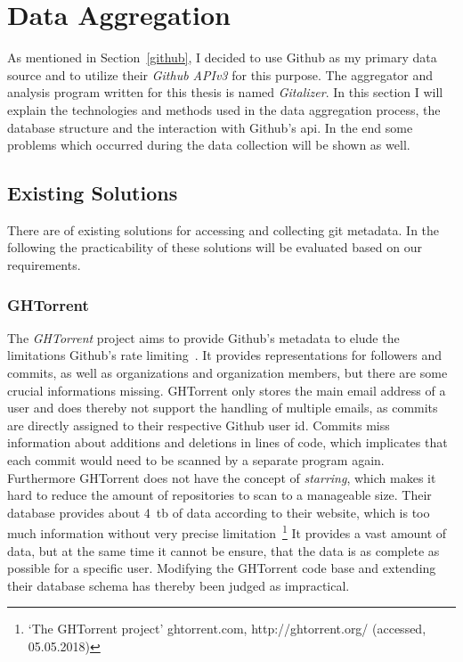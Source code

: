 \section{Data Aggregation}\label{aggregator}
As mentioned in Section~\ref{github}, I decided to use Github as my primary data source and to utilize their \emph{Github APIv3} for this purpose.
The aggregator and analysis program written for this thesis is named \emph{Gitalizer}.
In this section I will explain the technologies and methods used in the data aggregation process, the database structure and the interaction with Github's \ac{api}.
In the end some problems which occurred during the data collection will be shown as well.


\subsection{Existing Solutions}
There are of existing solutions for accessing and collecting git metadata.
In the following the practicability of these solutions will be evaluated based on our requirements.

\subsubsection{GHTorrent}
The \emph{GHTorrent} project aims to provide Github's metadata to elude the limitations Github's rate limiting~\cite{inproceedings:ghtorrent}.
It provides representations for followers and commits, as well as organizations and organization members, but there are some crucial informations missing.
GHTorrent only stores the main email address of a user and does thereby not support the handling of multiple emails, as commits are directly assigned to their respective Github user id.
Commits miss information about additions and deletions in lines of code, which implicates that each commit would need to be scanned by a separate program again.
Furthermore GHTorrent does not have the concept of \emph{starring}, which makes it hard to reduce the amount of repositories to scan to a manageable size.
Their database provides about 4~\ac{tb} of data according to their website, which is too much information without very precise limitation~\footnote{`The GHTorrent project' ghtorrent.com, http://ghtorrent.org/ (accessed, 05.05.2018)}
It provides a vast amount of data, but at the same time it cannot be ensure, that the data is as complete as possible for a specific user.
Modifying the GHTorrent code base and extending their database schema has thereby been judged as impractical.

